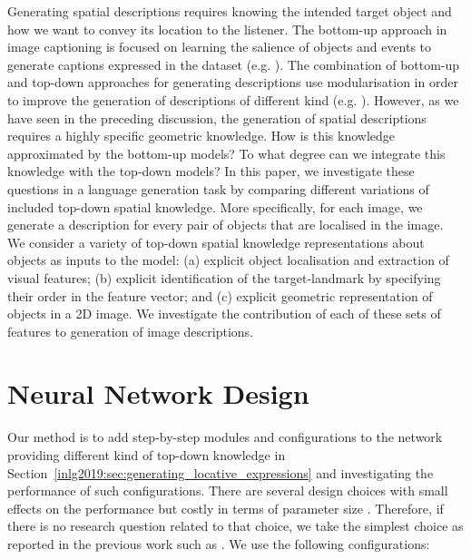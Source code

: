 Generating spatial descriptions requires knowing the intended target object
and how we want to convey its location to the listener.  The bottom-up
approach in image captioning is focused on learning the salience of
objects and events to generate captions expressed in the dataset (e.g. \citet{xu2015show}).  The combination of bottom-up and
top-down approaches for generating descriptions %
use modularisation in order to improve the generation of descriptions of different kind (e.g. \citet{you2016image}). %
However, as we have seen in the preceding discussion, the generation of
spatial descriptions requires a highly specific geometric knowledge.
How is this knowledge approximated by the bottom-up models?  To what
degree can we integrate this knowledge with the top-down models?  In this
paper, we investigate these questions in a language generation task by comparing
different variations of included top-down spatial knowledge.
More specifically, for each image, we generate a description
for every pair of objects that are localised in the image.
We consider a variety of top-down spatial knowledge representations about objects
as inputs to the model:
(a) explicit object localisation and extraction of visual features;
(b) explicit identification of the target-landmark by specifying their order in the feature vector;
and (c) explicit geometric representation of objects in a 2D image. %
We investigate the contribution of each of these sets of features to generation of image descriptions. %




\section{Neural Network Design}\label{inlg2019:sec:neural_net_design}

Our method is to add step-by-step modules and configurations to the network %
providing different kind of top-down knowledge in Section~\ref{inlg2019:sec:generating_locative_expressions} and investigating the performance of such configurations.
There are several design choices with small effects on the performance but costly in terms of parameter size \cite{tanti2018put}.
Therefore, if there is no research question related to that choice, we take the simplest choice as reported in the previous work such as \cite{lu2017knowing,anderson2018bottom}.
We
use the following configurations: %

